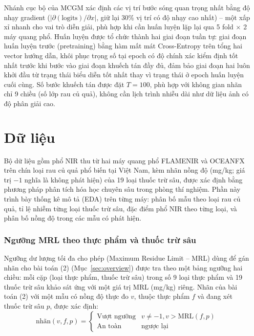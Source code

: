 \documentclass[10pt,twocolumn,twoside]{article}
\begin{document}
Nhánh cục bộ của MCGM xác định các vị trí bước sóng quan trọng nhất bằng độ
nhạy gradient ($|\partial(\text{logits})/\partial x|$, giữ lại 30\% vị trí
có độ nhạy cao nhất) -- một xấp xỉ nhanh cho vai trò diễn giải, phù hợp khi
cần huấn luyện lặp lại qua 5 fold $\times$ 2 máy quang phổ. Huấn luyện được
tổ chức thành hai giai đoạn tuần tự: giai đoạn huấn luyện trước
(pretraining) bằng hàm mất mát Cross-Entropy trên tổng hai vector hướng
dẫn, khôi phục trọng số tại epoch có độ chính xác kiểm định tốt nhất trước
khi bước vào giai đoạn khuếch tán đầy đủ, đảm bảo giai đoạn hai luôn khởi
đầu từ trạng thái biểu diễn tốt nhất thay vì trạng thái ở epoch huấn luyện
cuối cùng. Số bước khuếch tán được đặt $T=100$, phù hợp với không gian nhãn
chỉ 9 chiều (số lớp rau củ quả), không cần lịch trình nhiễu dài như dữ liệu
ảnh có độ phân giải cao.

\section{Dữ liệu}

Bộ dữ liệu gồm phổ NIR thu từ hai máy quang phổ FLAMENIR và OCEANFX trên
chín loại rau củ quả phổ biến tại Việt Nam, kèm nhãn nồng độ (mg/kg; giá trị
$-1$ nghĩa là không phát hiện) của 19 loại thuốc trừ sâu, được xác định bằng
phương pháp phân tích hóa học chuyên sâu trong phòng thí nghiệm. Phần này
trình bày thống kê mô tả (EDA) trên từng máy: phân bố mẫu theo loại rau củ
quả, tỉ lệ nhiễm từng loại thuốc trừ sâu, đặc điểm phổ NIR theo từng loại, và
phân bố nồng độ trong các mẫu có phát hiện.

\subsubsection{Ngưỡng MRL theo thực phẩm và thuốc trừ sâu}
\label{sec:data-thresholds}

Ngưỡng dư lượng tối đa cho phép (Maximum Residue Limit -- MRL) dùng để gán
nhãn cho bài toán (2) (Mục~\ref{sec:overview}) được tra theo một bảng ngưỡng
hai chiều: mỗi cặp (loại thực phẩm, thuốc trừ sâu) trong số 9 loại thực
phẩm và 19 thuốc trừ sâu khảo sát ứng với một giá trị MRL (mg/kg) riêng.
Nhãn của bài toán (2) với một mẫu có nồng độ thực đo $v$, thuộc thực phẩm
$f$ và đang xét thuốc trừ sâu $p$, được xác định:
\begin{equation}
\text{nhãn}(v, f, p) =
\begin{cases}
\text{Vượt ngưỡng} & v \ne -1, v > \mathrm{MRL}(f,p) \\
\text{An toàn} & \text{ngược lại}
\end{cases}
\label{eq:safety-label}
\end{equation}
\end{document}
